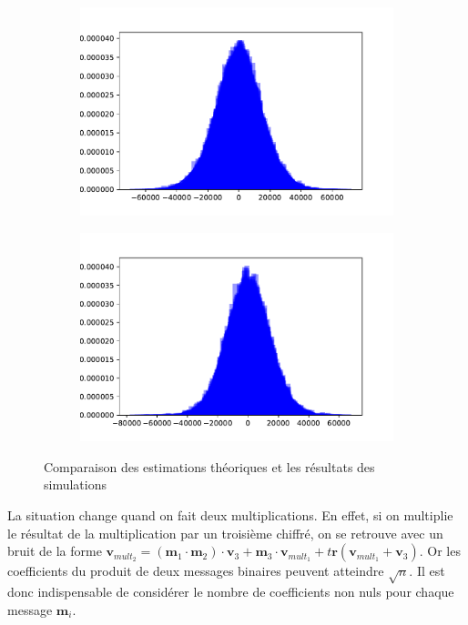 \documentclass[11pt, headsepline, a4paper, fleqn, oneside]{article}
\begin{document}
\begin{figure}[ht]
  \centering
  \begin{subfigure}[t]{2.5in}
    \hfill
    \includegraphics[width=\linewidth]{one_mult.pdf}
    \label{fig7-a}
  \end{subfigure}
  \begin{subfigure}[t]{2.5in}
    \hfill
    \includegraphics[width=\linewidth]{optim.pdf}
    \label{fig7-b}
  \end{subfigure}
\caption{Comparaison des estimations théoriques et les résultats des simulations}
\end{figure}

La situation change quand on fait deux multiplications. En effet, si on multiplie le résultat de la multiplication par un troisième chiffré, on se retrouve avec un bruit de la forme $\boldsymbol{v}_{mult_2} = (\boldsymbol{m}_{1}\cdot \boldsymbol{m}_{2})\cdot\boldsymbol{v}_{3}+\boldsymbol{m}_{3} \cdot\boldsymbol{v}_{mult_1}+t\boldsymbol{r}\left(\boldsymbol{v}_{mult_1}  +\boldsymbol{v}_{3}\right)$. Or les coefficients du produit de deux messages binaires peuvent atteindre $\sqrt{n}$. Il est donc indispensable de considérer le nombre de coefficients non nuls pour chaque message $\boldsymbol{m}_i$.\\
\end{document}
